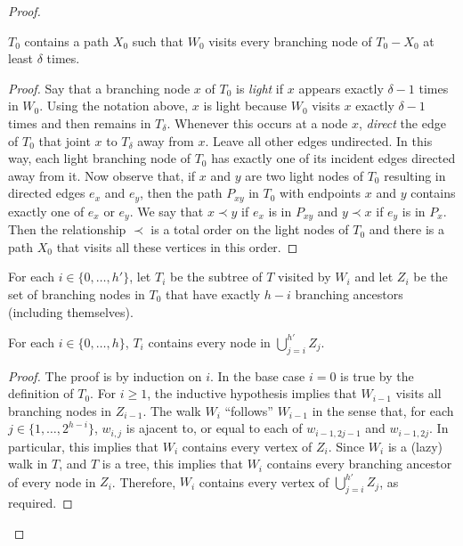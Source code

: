 \documentclass{patmorin}
\newcommand{\defin}[1]{\emph{\color{brightmaroon}#1}}
\begin{document}
\begin{proof}
  \begin{clm}
    $T_0$ contains a path $X_0$ such that $W_0$ visits every branching node of $T_0-X_0$ at least $\delta$ times.
  \end{clm}

  \begin{proof}
    Say that a branching node $x$ of $T_0$ is \defin{light} if $x$ appears exactly $\delta-1$ times in $W_0$. Using the notation above, $x$ is light because $W_0$ visits $x$ exactly $\delta-1$ times and then remains in $T_\delta$.  Whenever this occurs at a node $x$, \defin{direct} the edge of $T_0$ that joint $x$ to $T_\delta$ away from $x$. Leave all other edges undirected.  In this way, each light branching node of $T_0$ has exactly one of its incident edges directed away from it.  Now observe that, if $x$ and $y$ are two light nodes of $T_0$ resulting in directed edges $e_x$ and $e_y$, then the path $P_{xy}$ in $T_0$ with endpoints $x$ and $y$ contains exactly one of $e_x$ or $e_y$.  We say that $x\prec y$ if $e_x$ is in $P_{xy}$ and $y\prec x$ if $e_y$ is in $P_x$.  Then the relationship $\prec$ is a total order on the light nodes of $T_0$ and there is a path $X_0$ that visits all these vertices in this order.
  \end{proof}


  For each $i\in\{0,\ldots,h'\}$, let $T_i$ be the subtree of $T$ visited by $W_i$ and let $Z_i$ be the set of branching nodes in $T_0$ that have exactly $h-i$ branching ancestors (including themselves).

  \begin{clm}
    For each $i\in\{0,\ldots,h\}$, $T_i$ contains every node in $\bigcup_{j=i}^{h'}Z_j$.
  \end{clm}

  \begin{proof}
    The proof is by induction on $i$. In the base case $i=0$ is true by the definition of $T_0$.  For $i\ge 1$, the inductive hypothesis implies that $W_{i-1}$ visits all branching nodes in $Z_{i-1}$. The walk $W_{i}$ ``follows'' $W_{i-1}$ in the sense that, for each $j\in\{1,\ldots,2^{h-i}\}$, $w_{i,j}$ is ajacent to, or equal to each of $w_{i-1,2j-1}$ and $w_{i-1,2j}$.  In particular, this implies that $W_i$ contains every vertex of $Z_i$. Since $W_i$ is a (lazy) walk in $T$, and $T$ is a tree, this implies that $W_i$ contains every branching ancestor of every node in $Z_i$.  Therefore, $W_i$ contains every vertex of $\bigcup_{j=i}^{h'} Z_j$, as required.
  \end{proof}


\end{proof}
\end{document}
